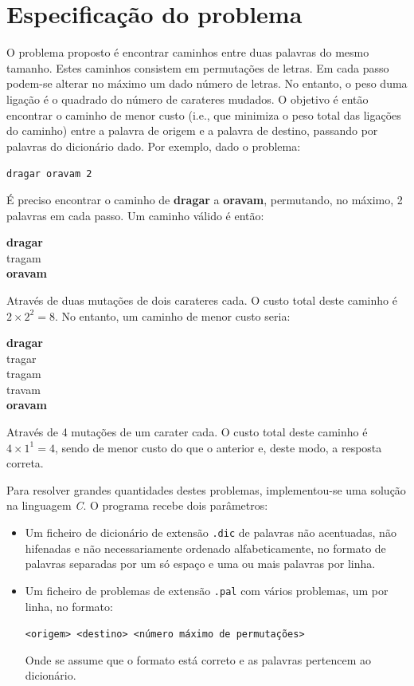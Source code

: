 \documentclass[portuguese, a4paper]{article}
\begin{document}


\tableofcontents
\newpage

\section{Especificação do problema}
	\par
	O problema proposto é encontrar caminhos entre duas palavras do mesmo
	tamanho. Estes caminhos consistem em permutações de letras. Em cada passo
	podem-se alterar no máximo um dado número de letras. No entanto, o peso duma
	ligação é o quadrado do número de carateres mudados. O objetivo é então
	encontrar o caminho de menor custo (i.e., que minimiza o peso total das
	ligações do caminho) entre a palavra de origem e a palavra de destino,
	passando por palavras do dicionário dado. Por exemplo, dado o problema:
	\begin{center}
		\texttt{dragar oravam 2}
	\end{center}
	\par
	É preciso encontrar o caminho de \textbf{dragar} a \textbf{oravam},
	permutando, no máximo, 2 palavras em cada passo. Um caminho válido é então:
	\begin{center}
		\textbf{dragar} \\
		tragam \\
		\textbf{oravam}
	\end{center}
	\par
	Através de duas mutações de dois carateres cada. O custo total deste caminho
	é $2 \times 2^2 = 8$. No entanto, um caminho de menor custo seria:
	\begin{center}
		\textbf{dragar} \\
		tragar \\
		tragam \\
		travam \\
		\textbf{oravam}
	\end{center}
	\par
	Através de 4 mutações de um carater cada. O custo total deste caminho é
	$4\times1^1 = 4$, sendo de menor custo do que o anterior e, deste modo, a
	resposta correta.
	\par
	Para resolver grandes quantidades destes problemas, implementou-se uma
	solução na linguagem \textit{C}. O programa recebe dois parâmetros: \\
	\begin{itemize}
		\item
		Um ficheiro de dicionário de extensão \texttt{.dic} de
		palavras não acentuadas, não hifenadas e não necessariamente ordenado
		alfabeticamente, no formato de palavras separadas por um só espaço e uma ou
		mais palavras por linha.
		\item
		Um ficheiro de problemas de extensão \texttt{.pal} com
		vários problemas, um por linha, no formato:
		\begin{center}
			\texttt{<origem> <destino> <número máximo de permutações>}
		\end{center}
		\par
		Onde se assume que o formato está correto e as palavras pertencem ao
		dicionário.
	\end{itemize}
\end{document}
